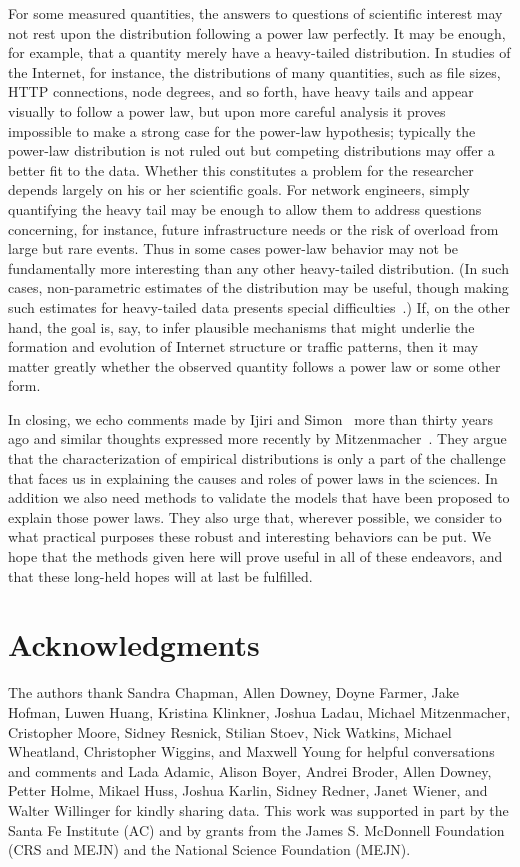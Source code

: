 \documentclass[final]{siamltex}
\begin{document}
For some measured quantities, the answers to questions of scientific
interest may not rest upon the distribution following a power law
perfectly.  It may be enough, for example, that a quantity merely have a
heavy-tailed distribution.  In studies of the Internet, for instance, the
distributions of many quantities, such as file sizes, HTTP connections,
node degrees, and so forth, have heavy tails and appear visually to follow
a power law, but upon more careful analysis it proves impossible to make a
strong case for the power-law hypothesis; typically the power-law
distribution is not ruled out but competing distributions may offer a
better fit to the data.  Whether this constitutes a problem for the
researcher depends largely on his or her scientific goals.  For network
engineers, simply quantifying the heavy tail may be enough to allow them to
address questions concerning, for instance, future infrastructure needs or
the risk of overload from large but rare events.  Thus in some cases %
power-law behavior may not be fundamentally more interesting than any other
heavy-tailed distribution.  (In such cases, non-parametric estimates of the
distribution may be useful, though making such estimates for heavy-tailed
data presents special
difficulties~\cite{Markovitch-Krieger-nonparametric-heavy-tails}.)  If, on
the other hand, the goal is, say, to infer plausible mechanisms that might
underlie the formation and evolution of Internet structure or traffic
patterns, then it may matter greatly whether the observed quantity follows
a power law or some other form.

In closing, we echo comments made by Ijiri and
Simon~\cite{Ijiri-Simon-skew} more than thirty years ago and similar
thoughts expressed more recently by Mitzenmacher~\cite{Mitzenmacher06}.
They argue that the characterization of empirical distributions is only a
part of the challenge that faces us in explaining the causes and roles of
power laws in the sciences.  In addition we also need methods to validate
the models that have been proposed to explain those power laws.  They also
urge that, wherever possible, we consider to what practical purposes these
robust and interesting behaviors can be put.  We hope that the methods
given here will prove useful in all of these endeavors, and that these
long-held hopes will at last be fulfilled.


\section*{Acknowledgments}
The authors thank Sandra Chapman, Allen Downey, Doyne Farmer, Jake Hofman,
Luwen Huang, Kristina Klinkner, Joshua Ladau, Michael Mitzenmacher,
Cristopher Moore, Sidney Resnick, Stilian Stoev, Nick Watkins, Michael
Wheatland, Christopher Wiggins, and Maxwell Young for helpful conversations
and comments and Lada Adamic, Alison Boyer, Andrei Broder, Allen Downey,
Petter Holme, Mikael Huss, Joshua Karlin, Sidney Redner, Janet Wiener, and
Walter Willinger for kindly sharing data.  This work was supported in part
by the Santa Fe Institute (AC) and by grants from the James S. McDonnell
Foundation (CRS and MEJN) and the National Science Foundation (MEJN).
\end{document}

